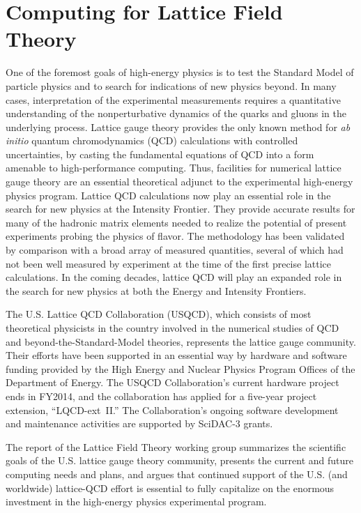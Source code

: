  
\section{Computing for Lattice Field Theory}
\label{chap:LFT}


One of the foremost goals of high-energy physics is to test the Standard Model
of particle physics and to search for indications of new physics beyond. In
many cases, interpretation of the experimental measurements requires a
quantitative understanding of the nonperturbative dynamics of the quarks and
gluons in the underlying process.  Lattice gauge theory provides the only
known method for \emph{ab initio} quantum chromodynamics (QCD) calculations
with controlled uncertainties, by casting the fundamental equations of QCD
into a form amenable to high-performance computing.  Thus, facilities for
numerical lattice gauge theory are an essential theoretical adjunct to the
experimental high-energy physics program.  Lattice QCD calculations now play
an essential role in the search for new physics at the Intensity Frontier.
They provide accurate results for many of the hadronic matrix elements needed
to realize the potential of present experiments probing the physics of
flavor. The methodology has been validated by comparison with a broad array of
measured quantities, several of which had not been well measured by experiment
at the time of the first precise lattice
calculations.  In the coming decades, lattice QCD will
play an expanded role in the search for new physics at both the Energy and
Intensity Frontiers.

The U.S. Lattice QCD Collaboration (USQCD), which consists of
most theoretical physicists in the country involved in the numerical studies
of QCD and beyond-the-Standard-Model theories, represents the lattice gauge
community.  Their efforts have been supported in an essential way by hardware
and software funding provided by the High Energy and Nuclear Physics Program
Offices of the Department of Energy.  The USQCD Collaboration's current
hardware project ends in FY2014, and the collaboration has applied for a
five-year project extension, ``LQCD-ext~II.''  The Collaboration's ongoing
software development and maintenance activities are supported by SciDAC-3
grants.

The report of the Lattice Field Theory working group summarizes the scientific
goals of the U.S. lattice gauge theory community, presents the current and
future computing needs and plans, and argues that continued support of the
U.S. (and worldwide) lattice-QCD effort is essential to fully capitalize on
the enormous investment in the high-energy physics experimental program.

